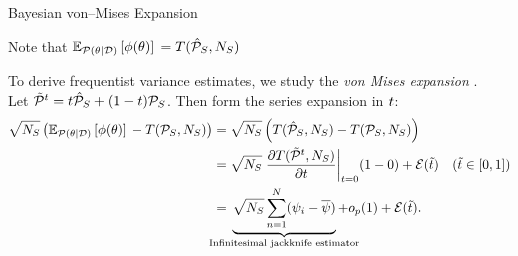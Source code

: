 \begin{frame}[t]{Bayesian von--Mises Expansion}

\generalizedpost{}

Note that $\mathbb{E}_{\mathcal{P}(\theta \vert \mathcal{D})}\left[ \phi(\theta)\right]\, = T({{\hat{\mathcal{P}}_{S}}}, {{N_S}})$
%
%

\pause

To derive frequentist variance estimates, we study the \textit{von Mises expansion}
\parencite{mises:1947:asymptotic}.\\
Let $\tilde{\mathcal{P}}^t  = t {{\hat{\mathcal{P}}_{S}}} + (1 - t) {{\mathcal{P}_{S}}}$.   Then 
form the series expansion in $t$:
%
\begin{align*}
    \sqrt{\nsur} \left(\expect{\post}{\phi(\theta)} - \T(\psur, \nsur) \right) ={}&
    \sqrt{\nsur} \left(\T(\psurhat, \nsur) - \T(\psur, \nsur) \right) \\={}&
        {\sqrt{\nsur} \fracat{\partial \T(\tilde\p^\t, \nsur)}{\partial \t}{\t = 0}}(1 - 0)
         + {\err(\ttil)} 
         & \textrm{(}\ttil \in [0,1]\textrm{)}
\\={}&
\undernote{
    {\sqrt{\nsur} \sumn (\infl_i - \overline{\infl})} }
    {\textrm{{Infinitesimal jackknife estimator}}} + o_p(1) 
    + {\err(\ttil)}.
\end{align*}
%
%
\end{frame}







